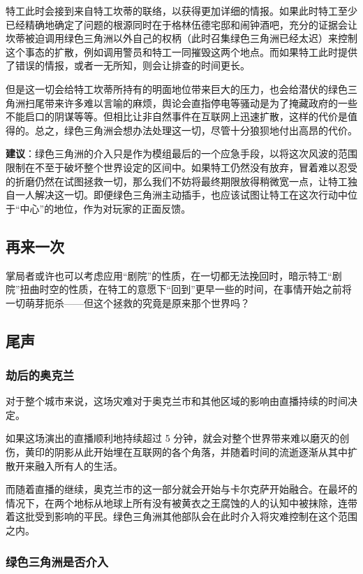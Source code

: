 特工此时会接到来自特工坎蒂的联络，以获得更加详细的情报。如果此时特工至少已经精确地确定了问题的根源同时在于格林伍德宅邸和闹钟酒吧，充分的证据会让坎蒂被迫调用绿色三角洲以外自己的权柄（此时召集绿色三角洲已经太迟）来控制这个事态的扩散，例如调用警员和特工一同摧毁这两个地点。而如果特工此时提供了错误的情报，或者一无所知，则会让排查的时间更长。

但是这一切会给特工坎蒂所持有的明面地位带来巨大的压力，也会给潜伏的绿色三角洲扫尾带来许多难以言喻的麻烦，舆论会直指停电等骚动是为了掩藏政府的一些不能启口的阴谋等等。但相比让非自然事件在互联网上迅速扩散，这样的代价是值得的。总之，绿色三角洲会想办法处理这一切，尽管十分狼狈地付出高昂的代价。

\textbf{建议}：绿色三角洲的介入只是作为模组最后的一个应急手段，以将这次风波的范围限制在不至于破坏整个世界设定的区间中。如果特工仍然没有放弃，冒着难以忍受的折磨仍然在试图拯救一切，那么我们不妨将最终期限放得稍微宽一点，让特工独自一人解决这一切。即便绿色三角洲主动插手，也应该试图让特工在这次行动中位于“中心”的地位，作为对玩家的正面反馈。

\subsection{再来一次}

掌局者或许也可以考虑应用“剧院”的性质，在一切都无法挽回时，暗示特工“剧院”扭曲时空的性质，在特工的意愿下“回到”更早一些的时间，在事情开始之前将一切萌芽扼杀——但这个拯救的究竟是原来那个世界吗？

\subsection{尾声}

\subsubsection{劫后的奥克兰}

对于整个城市来说，这场灾难对于奥克兰市和其他区域的影响由直播持续的时间决定。

如果这场演出的直播顺利地持续超过 5 分钟，就会对整个世界带来难以磨灭的创伤，黄印的阴影从此开始埋在互联网的各个角落，并随着时间的流逝逐渐从其中扩散开来融入所有人的生活。

而随着直播的继续，奥克兰市的这一部分就会开始与卡尔克萨开始融合。在最坏的情况下，在两个地标从地球上所有没有被黄衣之王腐蚀的人的认知中被抹除，连带着这批受到影响的平民。绿色三角洲其他部队会在此时介入将灾难控制在这个范围之内。

\subsubsection{绿色三角洲是否介入}

